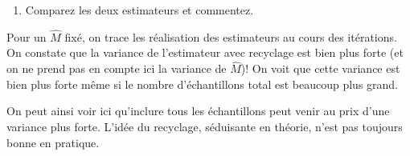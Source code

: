 \documentclass[]{article}
\newenvironment{Shaded}{\begin{snugshade}}{\end{snugshade}}
\newcommand{\CommentTok}[1]{\textcolor[rgb]{0.56,0.35,0.01}{\textit{#1}}}
\newcommand{\ControlFlowTok}[1]{\textcolor[rgb]{0.13,0.29,0.53}{\textbf{#1}}}
\newcommand{\DataTypeTok}[1]{\textcolor[rgb]{0.13,0.29,0.53}{#1}}
\newcommand{\DecValTok}[1]{\textcolor[rgb]{0.00,0.00,0.81}{#1}}
\newcommand{\KeywordTok}[1]{\textcolor[rgb]{0.13,0.29,0.53}{\textbf{#1}}}
\newcommand{\NormalTok}[1]{#1}
\newcommand{\OperatorTok}[1]{\textcolor[rgb]{0.81,0.36,0.00}{\textbf{#1}}}
\newcommand{\StringTok}[1]{\textcolor[rgb]{0.31,0.60,0.02}{#1}}
\providecommand{\tightlist}{%
  \setlength{\itemsep}{0pt}\setlength{\parskip}{0pt}}
\newenvironment{Correction}%
  { \vspace{\baselineskip}\begin{mdframed}[backgroundcolor=my_green]}%
  {\end{mdframed}}
\begin{document}
\begin{Shaded}
\end{Shaded}

\begin{enumerate}
\def\labelenumi{\arabic{enumi}.}
\setcounter{enumi}{10}
\tightlist
\item
  Comparez les deux estimateurs et commentez.
\end{enumerate}

\begin{Correction}
Pour un $\hat{M}$ fixé, on trace les réalisation des estimateurs au cours des itérations.
On constate que la variance de l'estimateur avec recyclage est bien plus forte (et on ne prend pas en compte ici la variance de $\hat{M}$)! On voit que cette variance est bien plus forte même si le nombre d'échantillons total est beaucoup plus grand.

On peut ainsi voir ici qu'inclure tous les échantillons peut venir au prix d'une variance plus forte. L'idée du recyclage, séduisante en théorie, n'est pas toujours bonne en pratique.
\end{Correction}
\end{document}
